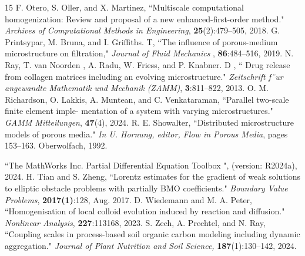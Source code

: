 \documentclass[reqno, 11pt]{amsart}
\numberwithin{equation}{section}
\begin{document}
\begin{thebibliography}{15}
\newblock F. Otero, S. Oller, and X. Martinez,
\newblock  ``Multiscale computational homogenization: Review and proposal of a
new enhanced-first-order method."
\newblock   \emph{Archives of Computational Methods in Engineering},  \textbf{25}(2):479–505, 2018.
\newblock  G. Printsypar, M. Bruna, and I. Griffiths. T,
\newblock  ``The influence of porous-medium microstructure on filtration,"
\newblock   \emph{Journal of Fluid Mechanics },  \textbf{86}:484–516, 2019.
\newblock N. Ray, T. van Noorden , A. Radu, W. Friess, and P. Knabner. D ,
\newblock  `` Drug release from collagen matrices including
an evolving microstructure."
\newblock   \emph{Zeitschrift f¨ur angewandte Mathematik und Mechanik (ZAMM)},  \textbf{3}:811–822,
2013. 
\newblock  O. M. Richardson, O. Lakkis, A. Muntean, and C. Venkataraman,
\newblock  ``Parallel two-scale finite element imple-
mentation of a system with varying microstructures."
\newblock   \emph{GAMM Mitteilungen},  \textbf{47}(4), 2024.
\newblock R. E. Showalter,
\newblock  ``Distributed microstructure models of porous media."
\newblock   \emph{In U. Hornung, editor, Flow in Porous Media},  \textbf{}pages 153–163. Oberwolfach, 1992. 

\newblock 
\newblock  ``The MathWorks Inc. Partial Differential Equation Toolbox ",
\newblock   \emph{} \textbf{}(version: R2024a), 2024. 
\newblock   H. Tian and S. Zheng,
\newblock  ``Lorentz estimates for the gradient of weak solutions to elliptic obstacle problems
with partially BMO coefficients."
\newblock   \emph{Boundary Value Problems},  \textbf{2017(1)}:128, Aug. 2017. 
\newblock D. Wiedemann and M. A. Peter,
\newblock  ``Homogenisation of local colloid evolution induced by reaction and diffusion."
\newblock   \emph{Nonlinear Analysis},  \textbf{227}:113168, 2023. 
\newblock S. Zech, A. Prechtel, and N. Ray,
\newblock  ``Coupling scales in process-based soil organic carbon modeling including dynamic aggregation."
\newblock   \emph{Journal of Plant Nutrition and Soil Science, }  \textbf{187}(1):130–142, 2024.




\end{thebibliography}


\end{document}
